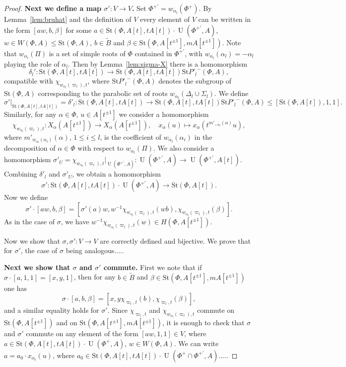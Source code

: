 \documentclass[oneside,12pt]{amsart}
\numberwithin{equation}{section}
\numberwithin{lem}{section}
\theoremstyle{definition}
\theoremstyle{remark}
\DeclareMathOperator{\UU}{U}
\newcommand{\Stb}{\mathrm{St}}
\begin{document}
\begin{proof}
{\bf Next we define a map $\sigma':V\to V$.} Set $\Phi^{+'}=w_{\alpha_l}(\Phi^+)$.
By Lemma~\ref{lem:bruhat} and the definition of $V$ every element of $V$
can be written in the form $[ a w,b,\beta]$ for some $ a\in\Stb(\Phi,A[t],tA[t])\cdot\UU(\Phi^{+'},A)$,
$w\in W(\Phi,A)\le\Stb(\Phi,A)$, $b\in\tilde B$ and $\beta\in \Stb(\Phi,A[t^{\pm 1}],mA[t^{\pm 1}])$.
Note that $w_{\alpha_l}(\Pi)$ is a set of simple roots of $\Phi$ contained in $\Phi^{+'}$, with
$w_{\alpha_l}(\alpha_l)=-\alpha_l$ playing the role of $\alpha_l$. Then by Lemma~\ref{lem:sigma-X}
there is a homomorphism
$$
\delta_l':\Stb(\Phi,A[t],tA[t])\to\Stb(\Phi,A[t],tA[t])\Stb {P'_l}^-(\Phi,A),
$$
compatible with $\chi_{w_{\alpha_l}(\varpi_l),t}$, where $\Stb {P'_l}^-(\Phi,A)$ denotes the subgroup
of $\Stb(\Phi,A)$ corresponding to the parabolic set of roots $w_{\alpha_l}(\Delta_l\cup\Sigma_l)$.
We define
$$
\sigma'|_{\Stb(\Phi,A[t],tA[t])}=\delta'_l:\Stb(\Phi,A[t],tA[t])\to\Stb(\Phi,A[t],tA[t])\Stb {P'_l}^-(\Phi,A)\le[\Stb(\Phi,A[t]),1,1].
$$
Similarly, for any $\alpha\in\Phi$, $u\in A[t^{\pm 1}]$ we consider a homomorphism
$$
\chi_{w_{\alpha_l}(\varpi_l),t}:X_\alpha(A[t^{\pm 1}])\to X_\alpha(A[t^{\pm 1}]),\quad
x_\alpha(u)\mapsto x_\alpha(t^{m'_{-\alpha_l}(\alpha)}u),
$$
where $m'_{w_{\alpha_l}(\alpha_i)}(\alpha)$, $1\le i\le l$, is the coefficient of $w_{\alpha_l}(\alpha_i)$
in the decomposition of $\alpha\in\Phi$ with respect to $w_{\alpha_l}(\Pi)$.
We also consider a homomorphism
$\sigma'_U=\chi_{w_{\alpha_l}(\varpi_l),t}|_{\UU(\Phi^{+'},A)}:\UU(\Phi^{+'},A)\to \UU(\Phi^{+'},A[t])$.
Combining $\delta'_l$ and $\sigma'_U$, we obtain a homomorphism
$$
\sigma':\Stb(\Phi,A[t],tA[t])\cdot\UU(\Phi^{+'},A)\to \Stb(\Phi,A[t]).
$$
Now we define
$$
\sigma'\cdot[ a w,b,\beta]=[\sigma'( a)w,w^{-1}\chi_{w_{\alpha_l}(\varpi_l),t}(wb),
\chi_{w_{\alpha_l}(\varpi_l),t}(\beta)].
$$
As in the case of $\sigma$, we have $w^{-1}\chi_{w_{\alpha_l}(\varpi_l),t}(w)\in H(\Phi,A[t^{\pm 1}])$.

Now we show that $\sigma,\sigma':V\to V$ are correctly defined and bijective. We prove that for $\sigma'$,
the case of $\sigma$ being analogous.....

{\bf Next we show that $\sigma$ and $\sigma'$ commute.}
First we note that if $\sigma\cdot[a,1,1]=[x,y,1]$, then for any $b\in\tilde B$ and
$\beta\in\Stb(\Phi,A[t^{\pm 1}],mA[t^{\pm 1}])$ one has
$$
\sigma\cdot[a,b,\beta]=[x,y\chi_{\varpi_l,t}(b),\chi_{\varpi_l,t}(\beta)],
$$
and a similar equality holds for $\sigma'$. Since
$\chi_{\varpi_l,t}$ and $\chi_{w_{\alpha_l}(\varpi_l),t}$ commute on $\Stb(\Phi,A[t^{\pm 1}])$
and on $\Stb(\Phi,A[t^{\pm 1}],mA[t^{\pm 1}])$, it is enough to check that $\sigma$ and $\sigma'$
commute on any element of the form $[a w,1,1]\in V$, where $a\in\Stb(\Phi,A[t],tA[t])\cdot\UU(\Phi^+,A)$,
$w\in W(\Phi,A)$. We can write $a=a_0\cdot x_{\alpha_l}(u)$, where
$a_0\in \Stb(\Phi,A[t],tA[t])\cdot\UU(\Phi^+\cap\Phi^{+'},A)$.....


\end{proof}
\end{document}
